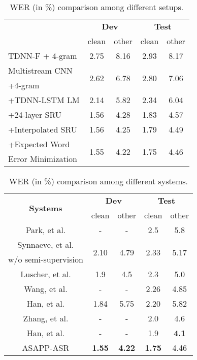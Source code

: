 \documentclass[a4paper]{article}
\begin{document}
\begin{table}[t]
\centering
\begin{tabular}{l|c|c|c|c}
\hline
\hspace{8mm} \multirow{2}{*}{\textbf{Setup}} & \multicolumn{2}{c|}{\textbf{Dev}} & \multicolumn{2}{c}{\small \textbf{Test}}\\
\cline{2-5} 
& clean & other & clean & other \\
\hline
TDNN-F + 4-gram & 2.75 & 8.16 & 2.93 & 8.17 \\ 
\hline
Multistream CNN & \multirow{2}{*}{2.62} & \multirow{2}{*}{6.78} & \multirow{2}{*}{2.80} & \multirow{2}{*}{7.06} \\ 
+4-gram & & & &  \\
\hline
+TDNN-LSTM LM & 2.14 & 5.82 & 2.34 & 6.04 \\
\hline
+24-layer SRU & 1.56 & 4.28 & 1.83 & 4.57\\
\hline
+Interpolated SRU & 1.56 & 4.25 & 1.79 & 4.49 \\
\hline
+Expected Word & \multirow{2}{*}{1.55} & \multirow{2}{*}{4.22} & \multirow{2}{*}{1.75} & \multirow{2}{*}{4.46} \\ 
\hspace{1mm} Error Minimization & & & &  \\
\hline
\end{tabular}
\vspace{1em}
\caption{WER (in \%) comparison among different setups.}
\label{table:wer_setup}
\end{table}

\begin{table}[t]
\centering
\begin{tabular}{c|c|c|c|c}
\hline
\multirow{2}{*}{\textbf{Systems}} & \multicolumn{2}{c|}{\textbf{Dev}} & \multicolumn{2}{c}{\small \textbf{Test}}\\
\cline{2-5} 
& clean & other & clean & other \\
\hline
Park, et al. \cite{specaugment} & - & - & 2.5 & 5.8 \\
\hline
Synnaeve, et al. \cite{synnaeve19} & \multirow{2}{*}{2.10} & \multirow{2}{*}{4.79} & \multirow{2}{*}{2.33} & \multirow{2}{*}{5.17} \\ 
w/o semi-supervision & & & &  \\
\hline
Luscher, et al. \cite{Luscher2019} & 1.9 & 4.5 & 2.3 & 5.0 \\
\hline
Wang, et al. \cite{wang20} & - & - & 2.26 & 4.85 \\
\hline
Han, et al. \cite{han19-2} & 1.84 & 5.75 & 2.20 & 5.82 \\ 
\hline
Zhang, et al. \cite{zhang2020transformer} & - & - & 2.0 & 4.6 \\
\hline
Han, et al. \cite{han2020contextnet} & - & - & 1.9 & \textbf{4.1} \\
\hline
ASAPP-ASR & \textbf{1.55} & \textbf{4.22} & \textbf{1.75} & 4.46 \\
\hline
\end{tabular}
\vspace{1em}
\caption{WER (in \%) comparison among different systems.}
\label{table:wer_system}
\vspace{-2mm}
\end{table}
\end{document}
